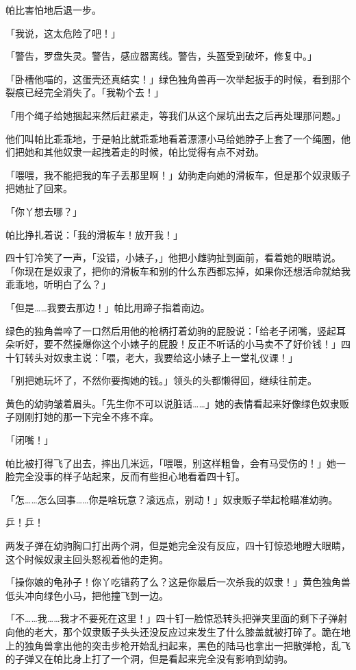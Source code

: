 帕比害怕地后退一步。

「我说，这太危险了吧！」

「{\mt 警告，罗盘失灵。警告，感应器离线。警告，头盔受到破坏，修复中。}」

「卧槽他喵的，这蛋壳还真结实！」绿色独角兽再一次举起扳手的时候，看到那个裂痕已经完全消失了。「我勒个去！」

「用个绳子给她捆起来然后赶紧走，等我们从这个屎坑出去之后再处理那问题。」

他们叫帕比乖乖地，于是帕比就乖乖地看着漂漂小马给她脖子上套了一个绳圈，他们把她和其他奴隶一起拽着走的时候，帕比觉得有点不对劲。

「喂喂，我不能把我的车子丢那里啊！」幼驹走向她的滑板车，但是那个奴隶贩子把她扯了回来。

「你丫想去哪？」

帕比挣扎着说：「我的滑板车！放开我！」

四十钉冷笑了一声，「没错，小婊子，」他把小雌驹扯到面前，看着她的眼睛说。「你现在是奴隶了，把你的滑板车和别的什么东西都忘掉，如果你还想活命就给我乖乖地，听明白了么？」

「但是……我要去那边！」帕比用蹄子指着南边。

绿色的独角兽啐了一口然后用他的枪柄打着幼驹的屁股说：「给老子闭嘴，竖起耳朵听好，要不然操爆你这个小婊子的屁股！反正不听话的小马卖不了好价钱！」四十钉转头对奴隶主说：「喂，老大，我要给这小婊子上一堂礼仪课！」

「别把她玩坏了，不然你要掏她的钱。」领头的头都懒得回，继续往前走。

黄色的幼驹皱着眉头。「先生你不可以说脏话……」她的表情看起来好像绿色奴隶贩子刚刚打她的那一下完全不疼不痒。

「闭嘴！」

帕比被打得飞了出去，摔出几米远，「喂喂，别这样粗鲁，会有马受伤的！」她一脸完全没事的样子站起来，反而有些担心地看着四十钉。

「怎……怎么回事……你是啥玩意？滚远点，别动！」奴隶贩子举起枪瞄准幼驹。

乒！乒！


两发子弹在幼驹胸口打出两个洞，但是她完全没有反应，四十钉惊恐地瞪大眼睛，这个时候奴隶主回头怒视着他的走狗。

「操你娘的龟孙子！你丫吃错药了么？这是你最后一次杀我的奴隶！」黄色独角兽低头冲向绿色小马，把他撞飞到一边。

「不……我……我才不要死在这里！」四十钉一脸惊恐转头把弹夹里面的剩下子弹射向他的老大，那个奴隶贩子头头还没反应过来发生了什么膝盖就被打碎了。跪在地上的独角兽拿出他的突击步枪开始乱扫起来，黑色的陆马也拿出一把散弹枪，乱飞的子弹又在帕比身上打了一个洞，但是看起来完全没有影响到幼驹。

